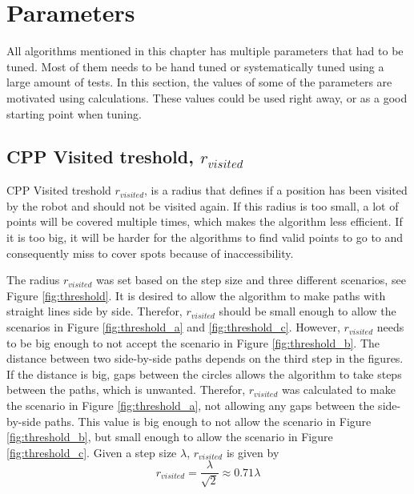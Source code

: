 \section{Parameters}
\label{sec:param_calc}
All algorithms mentioned in this chapter has multiple parameters that had to be tuned. Most of them needs to be hand tuned or systematically tuned using a large amount of tests. In this section, the values of some of the parameters are motivated using calculations. These values could be used right away, or as a good starting point when tuning.

\subsection{CPP Visited treshold, $r_{visited}$}
CPP Visited treshold $r_{visited}$, is a radius that defines if a position has been visited by the robot and should not be visited again. If this radius is too small, a lot of points will be covered multiple times, which makes the algorithm less efficient. If it is too big, it will be harder for the algorithms to find valid points to go to and consequently miss to cover spots because of inaccessibility.

The radius $r_{visited}$ was set based on the step size and three different scenarios, see Figure \ref{fig:threshold}. It is desired to allow the algorithm to make paths with straight lines side by side. Therefor, $r_{visited}$ should be small enough to allow the scenarios in Figure \ref{fig:threshold_a} and \ref{fig:threshold_c}. However, $r_{visited}$ needs to be big enough to not accept the scenario in Figure \ref{fig:threshold_b}. The distance between two side-by-side paths depends on the third step in the figures. If the distance is big, gaps between the circles allows the algorithm to take steps between the paths, which is unwanted. Therefor, $r_{visited}$ was calculated to make the scenario in Figure \ref{fig:threshold_a}, not allowing any gaps between the side-by-side paths. This value is big enough to not allow the scenario in Figure \ref{fig:threshold_b}, but small enough to allow the scenario in Figure \ref{fig:threshold_c}. Given a step size $\lambda$, $r_{visited}$ is given by
\begin{equation}
    r_{visited} = \frac{\lambda}{\sqrt{2}} \approx 0.71\lambda
    \label{eq:r_visited}
\end{equation}



